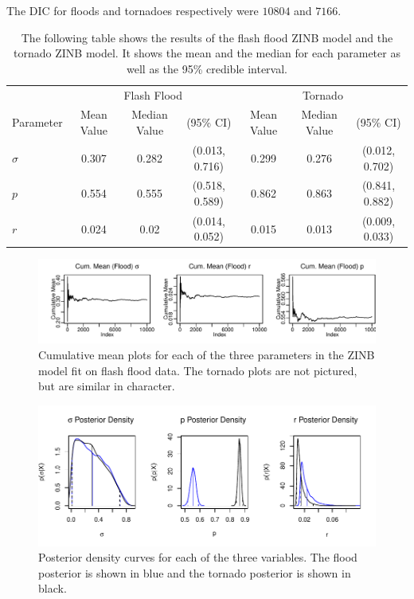 \documentclass{article}\usepackage[]{graphicx}\usepackage[]{color}
\makeatletter
\def\maxwidth{ %
  \ifdim\Gin@nat@width>\linewidth
    \linewidth
  \else
    \Gin@nat@width
  \fi
}
\newenvironment{knitrout}{}{} %
\makeatother
\begin{document}
The DIC for floods and tornadoes respectively were $10804$ and $7166$.
\begin{table}
\centering
\caption{The following table shows the results of the flash flood ZINB model and the tornado ZINB model. It shows the mean and the median for each parameter as well as the 95\% credible interval.}
\label{t:ZINBparams}
\begin{tabular}{lcccccc}
\toprule
&\multicolumn{3}{c}{Flash Flood}&\multicolumn{3}{c}{Tornado}\\
\cmidrule(r){2-4}\cmidrule(l){5-7}
Parameter & Mean Value &Median Value & (95\% CI)& Mean Value &Median Value & (95\% CI)\\
\midrule
$\sigma$ & 0.307 &
  0.282&
  (0.013, 
    0.716)&
  0.299 &
  0.276&
  (0.012, 
    0.702)\\
$p$ &  0.554 &
  0.555&
  (0.518, 
    0.589)&
  0.862 &
  0.863&
  (0.841, 
    0.882)\\
$r$ &  0.024 &
  0.02&
  (0.014, 
    0.052)&
  0.015 &
  0.013&
  (0.009, 
    0.033)\\
\bottomrule
\end{tabular}
\end{table}
\begin{figure}[p]
	\centering
\begin{knitrout}
\color{fgcolor}
\includegraphics[width=\maxwidth]{figure/floodconvergence-1} 

\end{knitrout}
	\caption{Cumulative mean plots for each of the three parameters in the ZINB model fit on flash flood data. The tornado plots are not pictured, but are similar in character.}
	\label{f:zinbconvergence}
\end{figure} 

\begin{figure}[p]
	\centering
\begin{knitrout}
\color{fgcolor}
\includegraphics[width=\maxwidth]{figure/zinbdensity-1} 

\end{knitrout}
	\caption{Posterior density curves for each of the three variables. The flood posterior is shown in blue and the tornado posterior is shown in black.}
	\label{f:zinbdensity}
\end{figure} 
\end{document}
